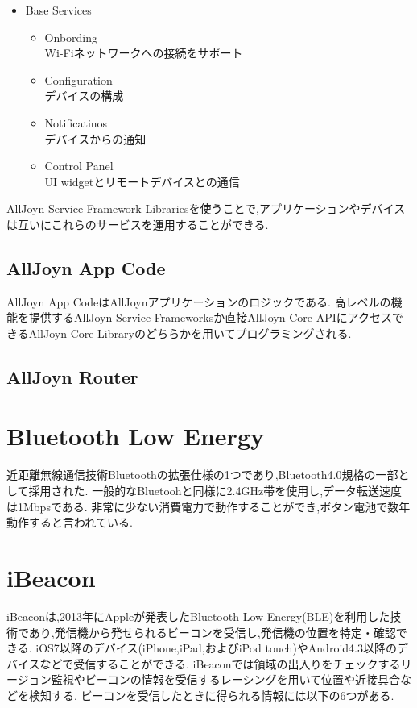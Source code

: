 \begin{itemize}
\item Base Services
\begin{itemize}
\item Onbording \\
Wi-Fiネットワークへの接続をサポート
\item Configuration \\
デバイスの構成
\item Notificatinos \\
デバイスからの通知
\item Control Panel \\
UI widgetとリモートデバイスとの通信
\end{itemize}
\end{itemize}

AllJoyn Service Framework Librariesを使うことで,アプリケーションやデバイスは互いにこれらのサービスを運用することができる.


\subsection{AllJoyn App Code}
AllJoyn App CodeはAllJoynアプリケーションのロジックである.
高レベルの機能を提供するAllJoyn Service Frameworksか直接AllJoyn Core APIにアクセスできるAllJoyn Core Libraryのどちらかを用いてプログラミングされる.

\subsection{AllJoyn Router}


\section{Bluetooth Low Energy}
近距離無線通信技術Bluetoothの拡張仕様の1つであり,Bluetooth4.0規格の一部として採用された.
一般的なBluetoohと同様に2.4GHz帯を使用し,データ転送速度は1Mbpsである.
非常に少ない消費電力で動作することができ,ボタン電池で数年動作すると言われている.

\section{iBeacon}
iBeacon\cite{iBeacon}は,2013年にAppleが発表したBluetooth Low Energy(BLE)を利用した技術であり,発信機から発せられるビーコンを受信し,発信機の位置を特定・確認できる.
iOS7以降のデバイス(iPhone,iPad,およびiPod touch)やAndroid4.3以降のデバイスなどで受信することができる.
iBeaconでは領域の出入りをチェックするリージョン監視やビーコンの情報を受信するレーシングを用いて位置や近接具合などを検知する.
ビーコンを受信したときに得られる情報には以下の6つがある.


